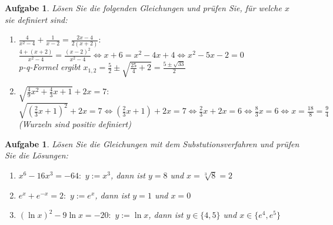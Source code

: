 \documentclass[12pt]{article}
\newtheorem{exercise}[satz]{Aufgabe}
\begin{document}
\begin{exercise}
  L\"osen Sie die folgenden Gleichungen und pr\"ufen Sie, f\"ur welche $x$ sie definiert sind:
  \begin{enumerate}
    \item[(a)] $\frac{4}{x^2-4}+\frac{1}{x-2} = \frac{2x-4}{2(x+2)}:$ \\  
       $\frac{4+(x+2)}{x^2-4}=\frac{(x-2)^2}{x^2-4}\Leftrightarrow x+6=x^2-4x+4
       \Leftrightarrow x^2-5x-2 = 0$\\
       p-q-Formel ergibt $x_{1,2} = \frac{5}{2}\pm\sqrt{\frac{25}{4}+2}=\frac{5\pm\sqrt{33}}{2}$
    \item[(b)] $\sqrt{\frac{4}{9}x^2+\frac{4}{3}x+1}+2x=7:$ \\ 
       $\sqrt{(\frac{2}{3}x+1)^2}+2x=7 \Leftrightarrow (\frac{2}{3}x+1)+2x=7\Leftrightarrow \frac{2}{3}x+2x=6 \Leftrightarrow \frac{8}{3}x = 6 \Leftrightarrow x=\frac{18}{8}=\frac{9}{4}$
       (Wurzeln sind positiv definiert)
  \end{enumerate}
\end{exercise} 

\vspace{0.1cm}

\begin{exercise}
  L\"osen Sie die Gleichungen mit dem Substutionsverfahren und pr\"ufen Sie die L\"osungen:
  \begin{enumerate}
    \item[(a)] $x^6-16x^3=-64:\,\, y:=x^3$, dann ist $y = 8$ und $x=\sqrt[3]{8}=2$
    \item[(b)] $e^x+e^{-x}=2:\,\, y:=e^x$, dann ist $y = 1$ und $x=0$
    \item[(c)] $(\ln{x})^2-9\ln{x}=-20:\,\, y:=\ln{x}$, dann ist $y\in\{4,5\}$ und $x\in\{e^4,e^5\}$
  \end{enumerate}
\end{exercise}

\vspace{0.1cm}
\end{document}
